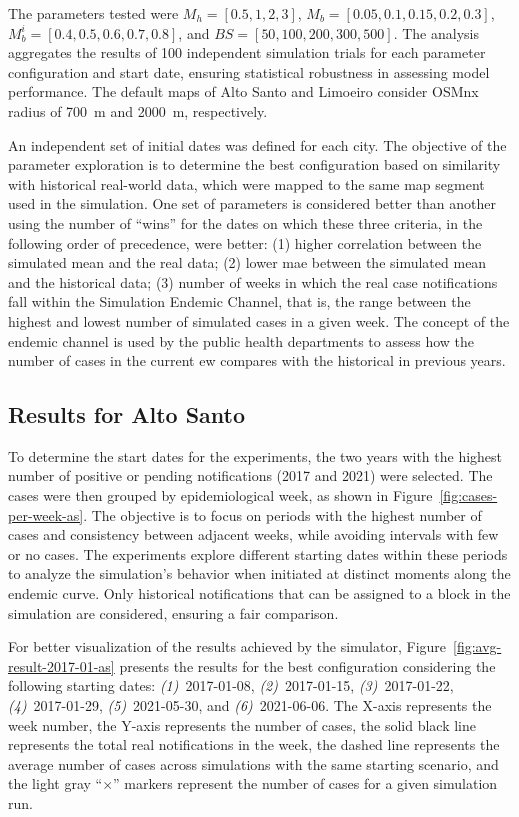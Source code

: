 The parameters tested were $M_h = [0.5, 1, 2, 3]$, $M_b = [0.05, 0.1, 0.15, 0.2, 0.3]$, $M_b^{i} = [0.4, 0.5, 0.6, 0.7, 0.8]$, and $BS = [50, 100, 200, 300, 500]$. The analysis aggregates the results of 100 independent simulation trials for each parameter configuration and start date, ensuring statistical robustness in assessing model performance. The default maps of Alto Santo and Limoeiro consider OSMnx radius of 700~m and 2000~m, respectively. 

An independent set of initial dates was defined for each city. 
The objective of the parameter exploration is to determine the best configuration based on similarity with historical real-world data, which were mapped to the same map segment used in the simulation. 
One set of parameters is considered better than another using the number of ``wins'' for the dates on which these three criteria, in the following order of precedence, were better: (1) higher correlation between the simulated mean and the real data; (2) lower \gls{mae} between the simulated mean and the historical data; (3) number of weeks in which the real case notifications fall within the Simulation Endemic Channel, that is, the range between the highest and lowest number of simulated cases in a given week. The concept of the endemic channel is used by the public health departments to assess how the number of cases in the current \gls{ew} compares with the historical in previous years. 

\subsection{Results for Alto Santo}\label{subsec:results-alto-santo}

To determine the start dates for the experiments, the two years with the highest number of positive or pending notifications (2017 and 2021) were selected. The cases were then grouped by epidemiological week, as shown in Figure~\ref{fig:cases-per-week-as}. The objective is to focus on periods with the highest number of cases and consistency between adjacent weeks, while avoiding intervals with few or no cases. The experiments explore different starting dates within these periods to analyze the simulation's behavior when initiated at distinct moments along the endemic curve. Only historical notifications that can be assigned to a block in the simulation are considered, ensuring a fair comparison.

For better visualization of the results achieved by the simulator, Figure~\ref{fig:avg-result-2017-01-as} presents the results for the best configuration considering the following starting dates: \textit{(1)}~2017-01-08, \textit{(2)}~2017-01-15, \textit{(3)}~2017-01-22, \textit{(4)}~2017-01-29, \textit{(5)}~2021-05-30, and \textit{(6)}~2021-06-06. The X-axis represents the week number, the Y-axis represents the number of cases, the solid black line represents the total real notifications in the week, the dashed line represents the average number of cases across simulations with the same starting scenario, and the light gray ``$\times$'' markers represent the number of cases for a given simulation run.

